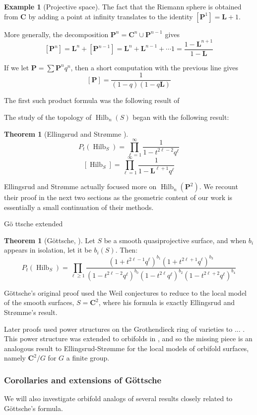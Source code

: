 \documentclass{amsart}[12pt]
\theoremstyle{definition}
\newtheorem{theorem}[dummy]{Theorem}
\newtheorem{example}[dummy]{Example}
\newcommand{\C}{\mathbf{C}}
\newcommand{\LL}{\mathbf{L}}
\newcommand{\proj}{\mathbf{P}}
\DeclareMathOperator{\Hilb}{Hilb}
\newcommand{\HG}{\Hilb}
\begin{document}
\begin{example}[Projective space]
The fact that the Riemann sphere is obtained from $\C$ by adding a point at infinity translates to the identity $[\proj^1]=\LL+1$.

More generally, the decomposition $\proj^n=\C^n\cup \proj^{n-1}$ gives
$$[\proj^n]=\LL^n+[\proj^{n-1}]=\LL^n+\LL^{n-1}+\cdots 1=\frac{1-\LL^{n+1}}{1-\LL}$$


If we let $\proj=\sum \proj^nq^n$, then a short computation with the previous line gives
$$[\proj]=\frac{1}{(1-q)(1-q\LL)}$$
\end{example}


The first such product formula was the following result of 

The study of the topology of $\Hilb_n(S)$ began with the following result:
\begin{theorem}[Ellingsrud and Str\o mme \cite{ES}]
$$P_t(\HG_S)=\prod_{\ell=1}^\infty \frac{1}{1-t^{2\ell-2}q^\ell}$$
$$[\HG_S]=\prod_{\ell=1}^\infty \frac{1}{1-\LL^{\ell +1}q^\ell}$$
\end{theorem}



Ellingsrud and Str\o mme actually focused more on $\Hilb_n(\proj^2)$.  We recount their proof in the next two sections as the geometric content of our work is essentially a small continuation of their methods.



G\"o ttsche extended 

\begin{theorem}[G\"ottsche, \cite{gottsche}]
Let $S$ be a smooth quasiprojective surface, and when $b_i$ appears in isolation, let it be $b_i(S)$.  Then:
$$P_t(\HG_S)=\prod_{\ell\geq 1} \frac{(1+t^{2\ell-1}q^\ell)^{b_1}(1+t^{2\ell+1}q^\ell)^{b_3}}{(1-t^{2\ell-2}q^\ell)^{b_0}(1-t^{2\ell}q^\ell)^{b_2}(1-t^{2\ell+2}q^\ell)^{b_4}}$$
\end{theorem}

G\"ottsche's original proof used the Weil conjectures to reduce to the local model of the smooth surfaces, $S=\C^2$, where his formula is exactly Ellingsrud and Str\o mme's result.

Later proofs used power structures on the Grothendieck ring of varieties to  ...
.  This power structure was extended to orbifolds in \cite{}, and so the missing piece is an analogous result to Ellingsrud-Str\o mme for the local models of orbifold surfaces, namely $\C^2/G$ for $G$ a finite group.  

\subsubsection{Corollaries and extensions of G\"ottsche}
We will also investigate orbifold analogs of several results closely related to G\"ottsche's formula.
\end{document}
